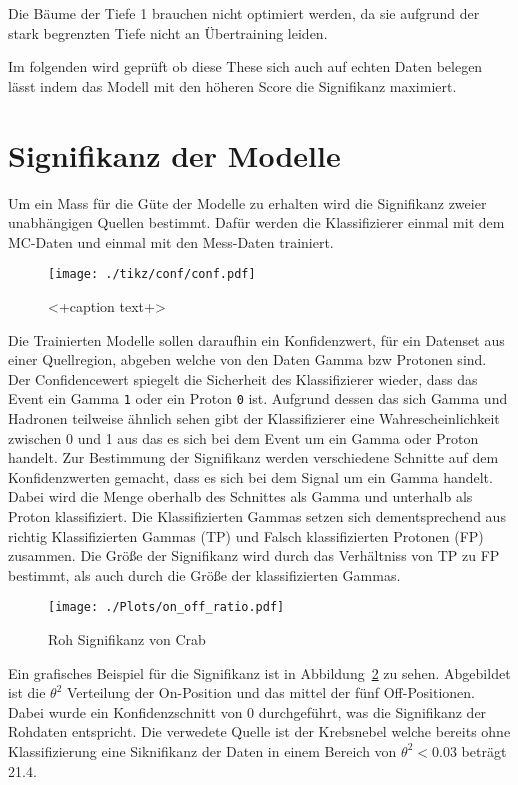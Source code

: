 Die Bäume der Tiefe 1 brauchen nicht optimiert werden, da sie aufgrund der stark begrenzten Tiefe nicht an Übertraining leiden.

Im folgenden wird geprüft ob diese These sich auch auf echten Daten belegen lässt indem das Modell mit den höheren Score die Signifikanz maximiert.
\section{Signifikanz der Modelle}
Um ein Mass für die Güte der Modelle zu erhalten wird die Signifikanz zweier unabhängigen Quellen bestimmt. 
Dafür werden die Klassifizierer einmal mit dem MC-Daten und einmal mit den Mess-Daten trainiert. 
\begin{figure}[H]
  \centering
  \texttt{[image: ./tikz/conf/conf.pdf]}
  \caption{<+caption text+>}
  \label{fig:<+label+>}
\end{figure}
Die Trainierten Modelle sollen daraufhin ein Konfidenzwert, für ein Datenset aus einer Quellregion, abgeben welche von den Daten Gamma bzw Protonen sind. 
Der Confidencewert spiegelt die Sicherheit des Klassifizierer wieder, dass das Event ein Gamma \texttt{1} oder ein Proton \texttt{0} ist. 
Aufgrund dessen das sich Gamma und Hadronen teilweise ähnlich sehen gibt der Klassifizierer eine Wahrescheinlichkeit zwischen 0 und 1 aus das es sich bei dem Event um ein Gamma oder Proton handelt.
Zur Bestimmung der Signifikanz werden verschiedene Schnitte auf dem Konfidenzwerten gemacht, dass es sich bei dem Signal um ein Gamma handelt.
Dabei wird die Menge oberhalb des Schnittes als Gamma und unterhalb als Proton klassifiziert. 
Die Klassifizierten Gammas setzen sich dementsprechend aus richtig Klassifizierten Gammas (TP) und Falsch klassifizierten Protonen (FP) zusammen. 
Die Größe der Signifikanz wird durch das Verhältniss von TP zu FP bestimmt, als auch durch die Größe der klassifizierten Gammas.

\begin{figure}
  \centering
  \texttt{[image: ./Plots/on\_off\_ratio.pdf]}
  \caption{Roh Signifikanz von Crab}
  \label{fig:sig_crab}
\end{figure}
Ein grafisches Beispiel für die Signifikanz ist in Abbildung~\ref{fig:sig_crab} zu sehen. 
Abgebildet ist die $\theta^{2}$ Verteilung der On-Position und das mittel der fünf Off-Positionen.
Dabei wurde ein Konfidenzschnitt von 0 durchgeführt, was die Signifikanz der Rohdaten entspricht.
Die verwedete Quelle ist der Krebsnebel welche bereits ohne Klassifizierung eine Siknifikanz der Daten in einem Bereich von $\theta^{2} < 0.03$ beträgt \SI{21,4}{\sigma}.

